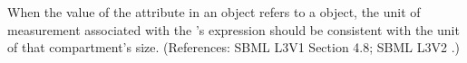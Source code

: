 When the value of the attribute  in an \InitialAssignment
object refers to a \Compartment object, the unit of measurement associated
with the \InitialAssignment's  expression should be consistent
with the unit of that compartment's size.  (References: SBML L3V1 Section 4.8; SBML L3V2
.)
